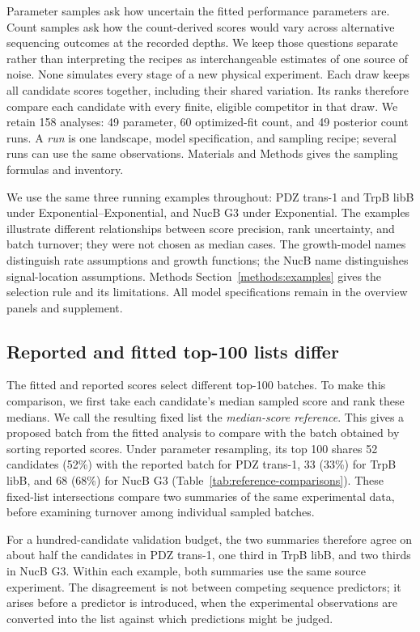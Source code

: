 \documentclass[11pt]{article}
\begin{document}
Parameter samples ask how uncertain the fitted performance parameters
are. Count samples ask how the count-derived scores would vary across
alternative sequencing outcomes at the recorded depths. We keep those
questions separate rather than interpreting the recipes as interchangeable
estimates of one source of noise. None simulates every stage of a new
physical experiment. Each draw keeps all candidate
scores together, including their shared variation. Its ranks therefore
compare each candidate with every finite, eligible competitor in that
draw. We retain 158 analyses: 49 parameter, 60 optimized-fit count, and
49 posterior count runs. A \emph{run} is one landscape, model specification,
and sampling recipe; several runs can use the same observations.
Materials and Methods gives the sampling formulas and inventory.

We use the same three running examples throughout: PDZ trans-1 and
TrpB libB under Exponential--Exponential, and NucB G3 under Exponential.
The examples illustrate different relationships between score precision,
rank uncertainty, and batch turnover; they were not chosen as median cases.
The growth-model names distinguish rate assumptions
and growth functions; the NucB name distinguishes signal-location
assumptions. Methods Section~\ref{methods:examples} gives the selection
rule and its limitations. All model specifications remain in the overview
panels and supplement.

\subsection{Reported and fitted top-100 lists differ}
\label{sec:reported}

The fitted and reported scores select different top-100 batches. To make
this comparison, we first take each candidate's median sampled score and
rank these medians. We call the resulting fixed list the
\emph{median-score reference}. This gives a proposed batch from the
fitted analysis to compare with the batch obtained by sorting reported
scores. Under parameter resampling, its top 100
shares 52 candidates (52\%) with the reported batch for PDZ trans-1, 33 (33\%)
for TrpB libB, and 68 (68\%) for NucB G3
(Table~\ref{tab:reference-comparisons}). These fixed-list intersections
compare two summaries of the same experimental data, before examining
turnover among individual sampled batches.

For a hundred-candidate validation budget, the two summaries therefore
agree on about half the candidates in PDZ trans-1, one third in
TrpB libB, and two thirds in NucB G3. Within each example, both summaries
use the same source experiment. The disagreement is
not between competing sequence predictors; it arises before a predictor
is introduced, when the experimental observations are converted into
the list against which predictions might be judged.
\end{document}
